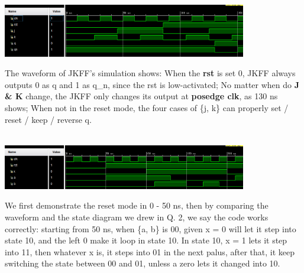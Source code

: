 \documentclass[onecolumn, oneside, ctexart]{SUSTechHomework}
\begin{document}
\centerline{\includegraphics[width=0.8\textwidth]{fig/jkff}}
\par The waveform of JKFF's simulation shows:  When the \textbf{rst} is set 0, JKFF always outputs 0 as q and 1 as q\_n, since the rst is low-activated;  No matter when do \textbf{J \& K} change, the JKFF only changes its output at \textbf{posedge clk}, as 130 ns shows;  When not in the reset mode, the four cases of \{j, k\} can properly set / reset / keep / reverse q.\\~\\

\centerline{\includegraphics[width=0.8\textwidth]{fig/t1q2}}
\par We first demonstrate the reset mode in 0 - 50 ns, then by comparing the waveform and the state diagram we drew in Q. 2, we say the code works correctly: starting from 50 ns, when \{a, b\} is 00, given x = 0 will let it step into state 10, and the left 0 make it loop in state 10. In state 10, x = 1 lets it step into 11, then whatever x is, it steps into 01 in the next palus, after that, it keep switching the state between 00 and 01, unless a zero lets it changed into 10.

\begin{center}
\end{center}
\end{document}
